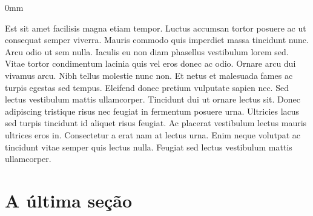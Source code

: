 \documentclass[./main.tex]{subfiles}
\begin{document}
\begin{adjustwidth}{\bodytab}{0mm}
\par Est sit amet facilisis magna etiam tempor. Luctus accumsan tortor posuere ac ut consequat semper viverra. Mauris commodo quis imperdiet massa tincidunt nunc. Arcu odio ut sem nulla. Iaculis eu non diam phasellus vestibulum lorem sed. Vitae tortor condimentum lacinia quis vel eros donec ac odio. Ornare arcu dui vivamus arcu. Nibh tellus molestie nunc non. Et netus et malesuada fames ac turpis egestas sed tempus. Eleifend donec pretium vulputate sapien nec. Sed lectus vestibulum mattis ullamcorper. Tincidunt dui ut ornare lectus sit. Donec adipiscing tristique risus nec feugiat in fermentum posuere urna. Ultricies lacus sed turpis tincidunt id aliquet risus feugiat. Ac placerat vestibulum lectus mauris ultrices eros in. Consectetur a erat nam at lectus urna. Enim neque volutpat ac tincidunt vitae semper quis lectus nulla. Feugiat sed lectus vestibulum mattis ullamcorper.
    
\end{adjustwidth}


\section{A última seção} \label{chp1:sec3}
\end{document}

